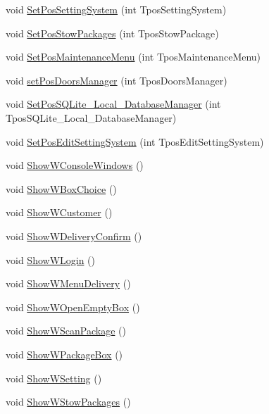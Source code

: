 \begin{DoxyCompactItemize}
\item 
void \hyperlink{class_show_widgets_a43eaeabac8ea2138824cd43223edf5ba}{Set\+Pos\+Setting\+System} (int Tpos\+Setting\+System)
\item 
void \hyperlink{class_show_widgets_abdd6508aab642e14181da711f55a810b}{Set\+Pos\+Stow\+Packages} (int Tpos\+Stow\+Package)
\item 
void \hyperlink{class_show_widgets_a5a75864fb86be29bf4a7d1ea3d1d6cab}{Set\+Pos\+Maintenance\+Menu} (int Tpos\+Maintenance\+Menu)
\item 
void \hyperlink{class_show_widgets_a17afc4d1af9efebdbec864c61911cac0}{set\+Pos\+Doors\+Manager} (int Tpos\+Doors\+Manager)
\item 
void \hyperlink{class_show_widgets_a810fd079c17ee54dd65e586204f64d26}{Set\+Pos\+S\+Q\+Lite\+\_\+\+Local\+\_\+\+Database\+Manager} (int Tpos\+S\+Q\+Lite\+\_\+\+Local\+\_\+\+Database\+Manager)
\item 
void \hyperlink{class_show_widgets_aa4a8155250252ffe44d17e07846bdaae}{Set\+Pos\+Edit\+Setting\+System} (int Tpos\+Edit\+Setting\+System)
\item 
void \hyperlink{class_show_widgets_a41e281e6f1ca3b1789f552ac60e00776}{Show\+W\+Console\+Windows} ()
\item 
void \hyperlink{class_show_widgets_ab038ff960339a0f5c89db56992a3235e}{Show\+W\+Box\+Choice} ()
\item 
void \hyperlink{class_show_widgets_aaabbf73abffc900127d4829dec8fd1a6}{Show\+W\+Customer} ()
\item 
void \hyperlink{class_show_widgets_a851f3c0b5c100bdfd5c5f540c738ec0d}{Show\+W\+Delivery\+Confirm} ()
\item 
void \hyperlink{class_show_widgets_aaf54034b425c4c6f8903abb3b3e9a960}{Show\+W\+Login} ()
\item 
void \hyperlink{class_show_widgets_af2fbfd95464a3bab01663fe19a80a1a4}{Show\+W\+Menu\+Delivery} ()
\item 
void \hyperlink{class_show_widgets_a0eb312bd11ecabca7a80b130bc1e9758}{Show\+W\+Open\+Empty\+Box} ()
\item 
void \hyperlink{class_show_widgets_a39a53de24f170fca45ef37b43a39c8e9}{Show\+W\+Scan\+Package} ()
\item 
void \hyperlink{class_show_widgets_a4e1eac80bbf827e314a45c5bd177c71a}{Show\+W\+Package\+Box} ()
\item 
void \hyperlink{class_show_widgets_aea1ab328a9374608259240d0c8958500}{Show\+W\+Setting} ()
\item 
void \hyperlink{class_show_widgets_ab4d4801904525c157626233ab19cb8bf}{Show\+W\+Stow\+Packages} ()

\end{DoxyCompactItemize}
